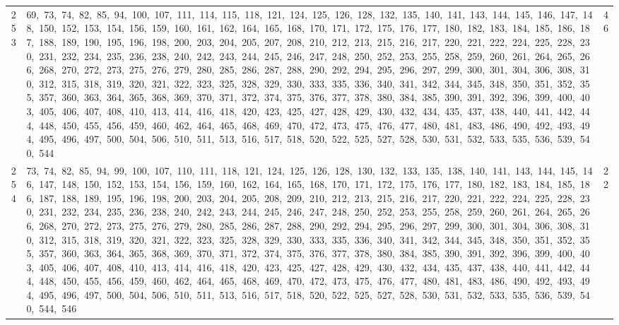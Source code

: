 \begin{longtable}{c|p{}|r}
253 & 69,\ 73,\ 74,\ 82,\ 85,\ 94,\ 100,\ 107,\ 111,\ 114,\ 115,\ 118,\ 121,\ 124,\ 125,\ 126,\ 128,\ 132,\ 135,\ 140,\ 141,\ 143,\ 144,\ 145,\ 146,\ 147,\ 148,\ 150,\ 152,\ 153,\ 154,\ 156,\ 159,\ 160,\ 161,\ 162,\ 164,\ 165,\ 168,\ 170,\ 171,\ 172,\ 175,\ 176,\ 177,\ 180,\ 182,\ 183,\ 184,\ 185,\ 186,\ 187,\ 188,\ 189,\ 190,\ 195,\ 196,\ 198,\ 200,\ 203,\ 204,\ 205,\ 207,\ 208,\ 210,\ 212,\ 213,\ 215,\ 216,\ 217,\ 220,\ 221,\ 222,\ 224,\ 225,\ 228,\ 230,\ 231,\ 232,\ 234,\ 235,\ 236,\ 238,\ 240,\ 242,\ 243,\ 244,\ 245,\ 246,\ 247,\ 248,\ 250,\ 252,\ 253,\ 255,\ 258,\ 259,\ 260,\ 261,\ 264,\ 265,\ 266,\ 268,\ 270,\ 272,\ 273,\ 275,\ 276,\ 279,\ 280,\ 285,\ 286,\ 287,\ 288,\ 290,\ 292,\ 294,\ 295,\ 296,\ 297,\ 299,\ 300,\ 301,\ 304,\ 306,\ 308,\ 310,\ 312,\ 315,\ 318,\ 319,\ 320,\ 321,\ 322,\ 323,\ 325,\ 328,\ 329,\ 330,\ 333,\ 335,\ 336,\ 340,\ 341,\ 342,\ 344,\ 345,\ 348,\ 350,\ 351,\ 352,\ 355,\ 357,\ 360,\ 363,\ 364,\ 365,\ 368,\ 369,\ 370,\ 371,\ 372,\ 374,\ 375,\ 376,\ 377,\ 378,\ 380,\ 384,\ 385,\ 390,\ 391,\ 392,\ 396,\ 399,\ 400,\ 403,\ 405,\ 406,\ 407,\ 408,\ 410,\ 413,\ 414,\ 416,\ 418,\ 420,\ 423,\ 425,\ 427,\ 428,\ 429,\ 430,\ 432,\ 434,\ 435,\ 437,\ 438,\ 440,\ 441,\ 442,\ 444,\ 448,\ 450,\ 455,\ 456,\ 459,\ 460,\ 462,\ 464,\ 465,\ 468,\ 469,\ 470,\ 472,\ 473,\ 475,\ 476,\ 477,\ 480,\ 481,\ 483,\ 486,\ 490,\ 492,\ 493,\ 494,\ 495,\ 496,\ 497,\ 500,\ 504,\ 506,\ 510,\ 511,\ 513,\ 516,\ 517,\ 518,\ 520,\ 522,\ 525,\ 527,\ 528,\ 530,\ 531,\ 532,\ 533,\ 535,\ 536,\ 539,\ 540,\ 544 & 46 \\
254 & 73,\ 74,\ 82,\ 85,\ 94,\ 99,\ 100,\ 107,\ 110,\ 111,\ 118,\ 121,\ 124,\ 125,\ 126,\ 128,\ 130,\ 132,\ 133,\ 135,\ 138,\ 140,\ 141,\ 143,\ 144,\ 145,\ 146,\ 147,\ 148,\ 150,\ 152,\ 153,\ 154,\ 156,\ 159,\ 160,\ 162,\ 164,\ 165,\ 168,\ 170,\ 171,\ 172,\ 175,\ 176,\ 177,\ 180,\ 182,\ 183,\ 184,\ 185,\ 186,\ 187,\ 188,\ 189,\ 195,\ 196,\ 198,\ 200,\ 203,\ 204,\ 205,\ 208,\ 209,\ 210,\ 212,\ 213,\ 215,\ 216,\ 217,\ 220,\ 221,\ 222,\ 224,\ 225,\ 228,\ 230,\ 231,\ 232,\ 234,\ 235,\ 236,\ 238,\ 240,\ 242,\ 243,\ 244,\ 245,\ 246,\ 247,\ 248,\ 250,\ 252,\ 253,\ 255,\ 258,\ 259,\ 260,\ 261,\ 264,\ 265,\ 266,\ 268,\ 270,\ 272,\ 273,\ 275,\ 276,\ 279,\ 280,\ 285,\ 286,\ 287,\ 288,\ 290,\ 292,\ 294,\ 295,\ 296,\ 297,\ 299,\ 300,\ 301,\ 304,\ 306,\ 308,\ 310,\ 312,\ 315,\ 318,\ 319,\ 320,\ 321,\ 322,\ 323,\ 325,\ 328,\ 329,\ 330,\ 333,\ 335,\ 336,\ 340,\ 341,\ 342,\ 344,\ 345,\ 348,\ 350,\ 351,\ 352,\ 355,\ 357,\ 360,\ 363,\ 364,\ 365,\ 368,\ 369,\ 370,\ 371,\ 372,\ 374,\ 375,\ 376,\ 377,\ 378,\ 380,\ 384,\ 385,\ 390,\ 391,\ 392,\ 396,\ 399,\ 400,\ 403,\ 405,\ 406,\ 407,\ 408,\ 410,\ 413,\ 414,\ 416,\ 418,\ 420,\ 423,\ 425,\ 427,\ 428,\ 429,\ 430,\ 432,\ 434,\ 435,\ 437,\ 438,\ 440,\ 441,\ 442,\ 444,\ 448,\ 450,\ 455,\ 456,\ 459,\ 460,\ 462,\ 464,\ 465,\ 468,\ 469,\ 470,\ 472,\ 473,\ 475,\ 476,\ 477,\ 480,\ 481,\ 483,\ 486,\ 490,\ 492,\ 493,\ 494,\ 495,\ 496,\ 497,\ 500,\ 504,\ 506,\ 510,\ 511,\ 513,\ 516,\ 517,\ 518,\ 520,\ 522,\ 525,\ 527,\ 528,\ 530,\ 531,\ 532,\ 533,\ 535,\ 536,\ 539,\ 540,\ 544,\ 546 & 22 \\

\end{longtable}
